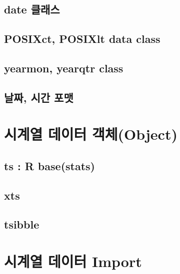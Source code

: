 \documentclass[
]{book}
\begin{document}
\hypertarget{date-uxd074uxb798uxc2a4}{%
\subsection{date 클래스}\label{date-uxd074uxb798uxc2a4}}

\hypertarget{posixct-posixlt-data-class}{%
\subsection{POSIXct, POSIXlt data class}\label{posixct-posixlt-data-class}}

\hypertarget{yearmon-yearqtr-class}{%
\subsection{yearmon, yearqtr class}\label{yearmon-yearqtr-class}}

\hypertarget{uxb0a0uxc9dc-uxc2dcuxac04-uxd3ecuxb9f7}{%
\subsection{날짜, 시간 포맷}\label{uxb0a0uxc9dc-uxc2dcuxac04-uxd3ecuxb9f7}}

\hypertarget{uxc2dcuxacc4uxc5f4-uxb370uxc774uxd130-uxac1duxccb4object}{%
\section{시계열 데이터 객체(Object)}\label{uxc2dcuxacc4uxc5f4-uxb370uxc774uxd130-uxac1duxccb4object}}

\hypertarget{ts-r-basestats}{%
\subsection{ts : R base(stats)}\label{ts-r-basestats}}

\hypertarget{xts}{%
\subsection{xts}\label{xts}}

\hypertarget{tsibble}{%
\subsection{tsibble}\label{tsibble}}

\hypertarget{uxc2dcuxacc4uxc5f4-uxb370uxc774uxd130-import}{%
\section{시계열 데이터 Import}\label{uxc2dcuxacc4uxc5f4-uxb370uxc774uxd130-import}}
\end{document}
